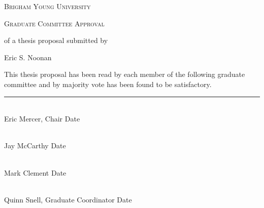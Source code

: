 \pagebreak

\begin{center}
\doublespacing

\textsc{Brigham Young University}

\textsc{Graduate Committee Approval}

of a thesis proposal submitted by

Eric S. Noonan
\end{center}

\noindent This thesis proposal has been read by each member of the
following graduate committee and by majority vote has been found to be
satisfactory.

\vspace{0.5cm}

\hrule

\vspace{0.5cm}

\newcommand{\signature}[1] {\vspace{1in} \noindent
\makebox[3.5in]{\hrulefill}  \hfill \makebox[2.5in]{\hrulefill}\\
\vspace{0.5cm} #1 \hfill Date \hspace{2in}}

\signature{Eric Mercer, Chair}

\signature{Jay McCarthy}

\signature{Mark Clement}

\signature{Quinn Snell, Graduate Coordinator}



